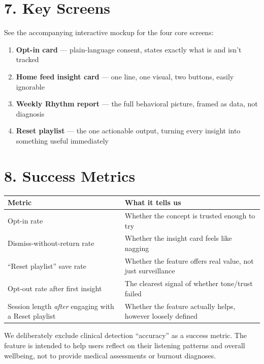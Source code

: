 \documentclass[11pt,a4paper]{article}
\begin{document}
\section*{7. Key Screens}
See the accompanying interactive mockup for the four core screens:
\begin{enumerate}[leftmargin=1.6em]
  \item \textbf{Opt-in card} --- plain-language consent, states exactly what is and isn't tracked
  \item \textbf{Home feed insight card} --- one line, one visual, two buttons, easily ignorable
  \item \textbf{Weekly Rhythm report} --- the full behavioral picture, framed as data, not diagnosis
  \item \textbf{Reset playlist} --- the one actionable output, turning every insight into something useful immediately
\end{enumerate}

\section*{8. Success Metrics}

\begin{table}[h!]
\renewcommand{\arraystretch}{1.4}
\begin{tabularx}{\textwidth}{@{}p{5.2cm}X@{}}
\toprule
\textbf{Metric} & \textbf{What it tells us} \\
\midrule
Opt-in rate & Whether the concept is trusted enough to try \\
Dismiss-without-return rate & Whether the insight card feels like nagging \\
``Reset playlist'' save rate & Whether the feature offers real value, not just surveillance \\
Opt-out rate after first insight & The clearest signal of whether tone/trust failed \\
Session length \emph{after} engaging with a Reset playlist & Whether the feature actually helps, however loosely defined \\
\bottomrule
\end{tabularx}
\end{table}

We deliberately exclude clinical detection ``accuracy'' as a success metric. The feature is intended to help users reflect on their listening patterns and overall wellbeing, not to provide medical assessments or burnout diagnoses.
\end{document}
